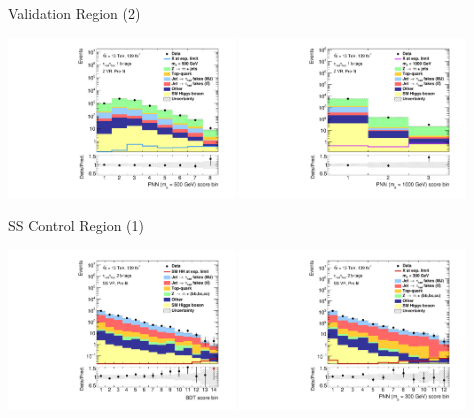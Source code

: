 \documentclass[11pt, xcolor={dvipsnames}, aspectratio=169, notes]{beamer}
\begin{document}
\begin{frame}{ Validation Region (2)}
  \centering

  \includegraphics[width=0.45\textwidth]{vrplots/zvr/Region_BMin0_incJet1_distPNN500_J2_Y2015_DLLOS_T1_SpcTauHH_L0_Prefitlog}%
  \hfill%
  \includegraphics[width=0.45\textwidth]{vrplots/zvr/Region_BMin0_incJet1_distPNN1000_J2_Y2015_DLLOS_T1_SpcTauHH_L0_Prefitlog}
\end{frame}


\begin{frame}{SS Control Region (1)}
  \centering

  \includegraphics[width=0.45\textwidth]{vrplots/ssvr/Region_BMin0_incJet1_distSMBDT_J2_Y2015_DLLSS_T2_SpcTauHH_L0_Prefitlog}%
  \hfill%
  \includegraphics[width=0.45\textwidth]{vrplots/ssvr/Region_BMin0_incJet1_distPNN300_J2_Y2015_DLLSS_T2_SpcTauHH_L0_Prefitlog}
\end{frame}
\end{document}
